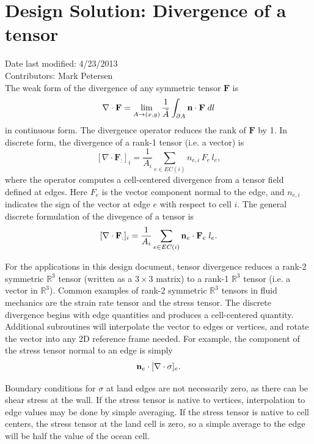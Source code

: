 \documentclass[11pt]{report}
\begin{document}
\newpage
\section{Design Solution: Divergence of a tensor}
Date last modified: 4/23/2013 \\
Contributors: Mark Petersen \\

The weak form of the divergence of any symmetric tensor ${\mathbf F}$ is 
\begin{equation}
\label{cont div}
\nabla \cdot \mathbf{F} 
= 
\lim_{A\rightarrow(x,y)} \frac{1}{\tilde{A}} 
\int_{\partial A}
  {\bf n}\cdot{\mathbf F} \; dl
\end{equation}
in continuous form.  The divergence operator reduces the rank of $\mathbf{F}$ by 1.  In discrete form, the divergence of a rank-1 tensor (i.e. a vector) is
\begin{equation}
\label{discrete div}
[\nabla \cdot \mathbf{F}_:]_{i} = \frac{1} {A_i} \sum\limits_{e \in EC(i)} {n_{e,i} \, F_e \, l_e},
\end{equation}
where the operator computes a cell-centered divergence from a tensor field defined at edges. Here $F_e$ is the vector component normal to the edge, and $n_{e,i}$ indicates the sign of the vector at edge $e$ with respect to cell $i$.  The general discrete formulation of the divegence of a tensor is
\begin{equation}
\label{discrete div tensor}
[\nabla \cdot \mathbf{F}_:]_{i} = \frac{1} {A_i} \sum\limits_{e \in EC(i)} {\bf n}_e\cdot\mathbf{F}_e \; l_e.
\end{equation}

For the applications in this design document, tensor divergence reduces a rank-2 symmetric $\mathbb{R}^3$ tensor (written as a $3\times 3$ matrix) to a rank-1 $\mathbb{R}^3$ tensor (i.e. a vector in $\mathbb{R}^3$).  Common examples of rank-2 symmetric $\mathbb{R}^3$ tensors in fluid mechanics are the strain rate tensor and the stress tensor.  The discrete divergence begins with edge quantities and produces a cell-centered quantity.  Additional subroutines will interpolate the vector to edges or vertices, and rotate the vector into any 2D reference frame needed.  For example, the component of the stress tensor normal to an edge is simply
\begin{equation}
{\bf n}_e\cdot[\nabla \cdot \sigma]_{e}.
\end{equation}

Boundary conditions for $\sigma$ at land edges are not necessarily zero, as there can be shear stress at the wall.  If the stress tensor is native to vertices, interpolation to edge values may be done by simple averaging.  If the stress tensor is native to cell centers, the stress tensor at the land cell is zero, so a simple average to the edge will be half the value of the ocean cell.
\end{document}
